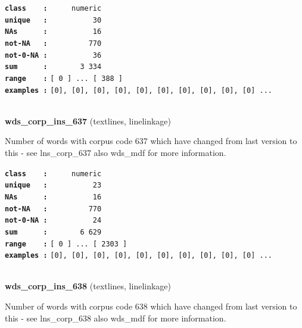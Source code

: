 \documentclass[]{article}
\begin{document}
\textbf{\texttt{class\ \ \ \ :}} \texttt{~~~~~numeric}\\
\textbf{\texttt{unique\ \ \ :}} \texttt{~~~~~~~~~~30}\\
\textbf{\texttt{NAs\ \ \ \ \ \ :}} \texttt{~~~~~~~~~~16}\\
\textbf{\texttt{not-NA\ \ \ :}} \texttt{~~~~~~~~~770}\\
\textbf{\texttt{not-0-NA\ :}} \texttt{~~~~~~~~~~36}\\
\textbf{\texttt{sum\ \ \ \ \ \ :}} \texttt{~~~~~~~3~334}\\
\textbf{\texttt{range\ \ \ \ :}}
\texttt{{[}\ 0\ {]}\ ...\ {[}\ 388\ {]}}\\
\textbf{\texttt{examples\ :}}
\texttt{{[}0{]},\ {[}0{]},\ {[}0{]},\ {[}0{]},\ {[}0{]},\ {[}0{]},\ {[}0{]},\ {[}0{]},\ {[}0{]},\ {[}0{]}\ ...}\\

~

\textbf{wds\_corp\_ins\_637} (textlines, linelinkage)

Number of words with corpus code 637 which have changed from last
version to this - see lns\_corp\_637 also wds\_mdf for more information.

\textbf{\texttt{class\ \ \ \ :}} \texttt{~~~~~numeric}\\
\textbf{\texttt{unique\ \ \ :}} \texttt{~~~~~~~~~~23}\\
\textbf{\texttt{NAs\ \ \ \ \ \ :}} \texttt{~~~~~~~~~~16}\\
\textbf{\texttt{not-NA\ \ \ :}} \texttt{~~~~~~~~~770}\\
\textbf{\texttt{not-0-NA\ :}} \texttt{~~~~~~~~~~24}\\
\textbf{\texttt{sum\ \ \ \ \ \ :}} \texttt{~~~~~~~6~629}\\
\textbf{\texttt{range\ \ \ \ :}}
\texttt{{[}\ 0\ {]}\ ...\ {[}\ 2303\ {]}}\\
\textbf{\texttt{examples\ :}}
\texttt{{[}0{]},\ {[}0{]},\ {[}0{]},\ {[}0{]},\ {[}0{]},\ {[}0{]},\ {[}0{]},\ {[}0{]},\ {[}0{]},\ {[}0{]}\ ...}\\

~

\textbf{wds\_corp\_ins\_638} (textlines, linelinkage)

Number of words with corpus code 638 which have changed from last
version to this - see lns\_corp\_638 also wds\_mdf for more information.
\end{document}
